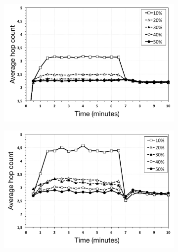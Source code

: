 \begin{figure}
\centering
\begin{subfigure}{.5\textwidth}
  \centering
  \includegraphics[keepaspectratio=true, width=1\linewidth]{images/average_hop_count_flash_crowd_1impl}
  \caption{}
  \label{fig:average_hop_count_flash_crowd_1impl}
\end{subfigure}%
\begin{subfigure}{.5\textwidth}
  \centering
  \includegraphics[keepaspectratio=true, width=1\linewidth]{images/average_hop_count_flash_crowd_2impl}
  \caption{}
  \label{fig:average_hop_count_flash_crowd_2impl}
\end{subfigure}
\begin{subfigure}{.5\textwidth}
  \centering

\end{subfigure}
\end{figure}
